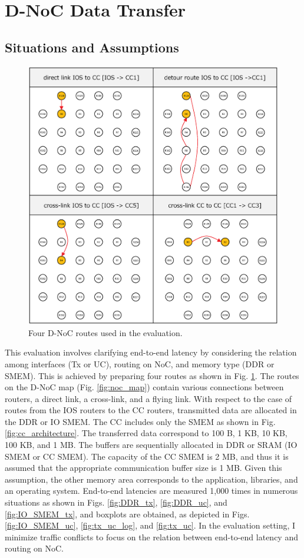 \section{D-NoC Data Transfer}
\label{sec:dnoc_eval}

\subsection{Situations and Assumptions}
\label{sec:situations_and_assumptions2}

\begin{figure}[thbp]
  \centering
  \includegraphics[width=0.5\linewidth]{../figure/noc_routes_old.eps}
      \caption{\label{fig:noc_routes}
    Four D-NoC routes used in the evaluation.}
\end{figure}

This evaluation involves clarifying end-to-end latency by considering the relation among interfaces (Tx or UC), routing on NoC, and memory type (DDR or SMEM).
This is achieved by preparing four routes as shown in Fig. \ref{fig:noc_routes}.
The routes on the D-NoC map (Fig. \ref{fig:noc_map}) contain various connections between routers, a direct link, a cross-link, and a flying link.
With respect to the case of routes from the IOS routers to the CC routers, transmitted data are allocated in the DDR or IO SMEM.
The CC includes only the SMEM as shown in Fig. \ref{fig:cc_architecture}.
The transferred data correspond to 100 B, 1 KB, 10 KB, 100 KB, and 1 MB.
The buffers are sequentially allocated in DDR or SRAM (IO SMEM or CC SMEM).
The capacity of the CC SMEM is 2 MB, and thus it is assumed that the appropriate communication buffer size is 1 MB.
Given this assumption, the other memory area corresponds to the application, libraries, and an operating system.
End-to-end latencies are measured 1,000 times in numerous situations as shown in Figs. \ref{fig:DDR_tx}, \ref{fig:DDR_uc}, and \ref{fig:IO_SMEM_tx}, and boxplots are obtained, as depicted in Figs. \ref{fig:IO_SMEM_uc}, \ref{fig:tx_uc_log}, and \ref{fig:tx_uc}.
In the evaluation setting, I minimize traffic conflicts to focus on the relation between end-to-end latency and routing on NoC.

